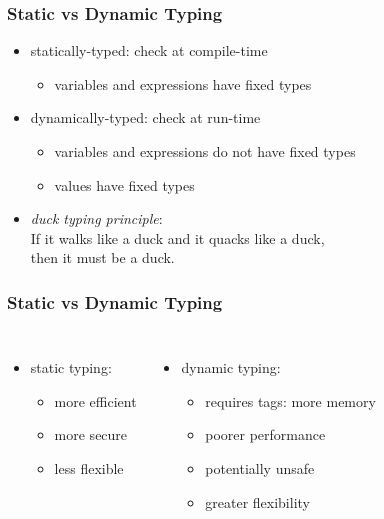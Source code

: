 \documentclass[dvipsnames]{beamer}
\theoremstyle{plain}
\begin{document}
\begin{frame}
  \frametitle{Static vs Dynamic Typing}

  \begin{itemize}
    \item \alert{statically-typed}: check at compile-time
    \begin{itemize}
      \item variables and expressions have fixed types
    \end{itemize}

    \pause
    \bigskip
    \item \alert{dynamically-typed}: check at run-time
    \begin{itemize}
      \item variables and expressions do not have fixed types
      \item values have fixed types
    \end{itemize}
    \pause
    \item \emph{duck typing principle}:\\
      If it walks like a duck and it quacks like a duck,\\
      then it must be a duck.
  \end{itemize}
\end{frame}

\begin{frame}
  \frametitle{Static vs Dynamic Typing}

  \begin{columns}[t]
    \begin{itemize}
      \item static typing:
      \begin{itemize}
        \item more efficient
        \item more secure
        \item less flexible
      \end{itemize}
    \end{itemize}

    \pause
    \begin{itemize}
      \item dynamic typing:
      \begin{itemize}
        \item requires tags: more memory
        \item poorer performance
        \item potentially unsafe
        \item greater flexibility
      \end{itemize}
    \end{itemize}
  \end{columns}
\end{frame}
\end{document}
